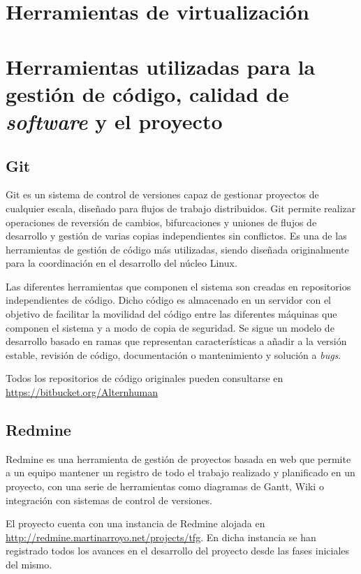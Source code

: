 \section{Herramientas de virtualización}
\citationneeded[QEMU]

\section{Herramientas utilizadas para la gestión de código, calidad de \textit{software} y el proyecto}

\subsection{Git}

Git es un sistema de control de versiones capaz de gestionar proyectos de cualquier escala, diseñado para flujos de trabajo distribuidos. Git permite realizar operaciones de reversión de cambios, bifurcaciones y uniones de flujos de desarrollo y gestión de varias copias independientes sin conflictos. Es una de las herramientas de gestión de código más utilizadas, siendo diseñada originalmente para la coordinación en el desarrollo del núcleo Linux.

Las diferentes herramientas que componen el sistema son creadas en repositorios independientes de código. Dicho código es almacenado en un servidor con el objetivo de facilitar la movilidad del código entre las diferentes máquinas que componen el sistema y a modo de copia de seguridad. Se sigue un modelo de desarrollo basado en ramas que representan características a añadir a la versión estable, revisión de código, documentación o mantenimiento y solución a \textit{bugs}.

Todos los repositorios de código originales pueden consultarse en \href{https://bitbucket.org/Alternhuman}{https://bitbucket.org/Alternhuman}

\subsection{Redmine}

Redmine es una herramienta de gestión de proyectos basada en web que permite a un equipo mantener un registro de todo el trabajo realizado y planificado en un proyecto, con una serie de herramientas como diagramas de Gantt, Wiki o integración con sistemas de control de versiones.

El proyecto cuenta con una instancia de Redmine alojada en \href{http://redmine.martinarroyo.net/}{http://redmine.martinarroyo.net/projects/tfg}. En dicha instancia se han registrado todos los avances en el desarrollo del proyecto desde las fases iniciales del mismo.


